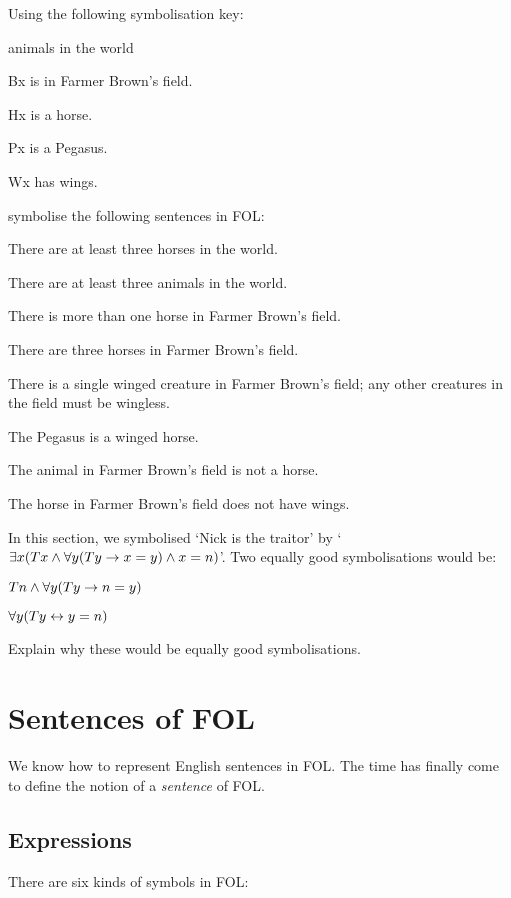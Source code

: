 \problempart Using the following symbolisation key:
\begin{ekey}
\item[\text{domain}] animals in the world
\item[Bx]  is in Farmer Brown's field.
\item[Hx]  is a horse.
\item[Px]  is a Pegasus.
\item[Wx]  has wings.
\end{ekey}
symbolise the following sentences in FOL:
\begin{earg}
\item There are at least three horses in the world.
\item There are at least three animals in the world.
\item There is more than one horse in Farmer Brown's field.
\item There are three horses in Farmer Brown's field.
\item There is a single winged creature in Farmer Brown's field; any other creatures in the field must be wingless.
\item The Pegasus is a winged horse.
\item The animal in Farmer Brown's field is not a horse.
\item The horse in Farmer Brown's field does not have wings.
\end{earg}

\problempart
In this section, we symbolised `Nick is the traitor' by `$\exists x (Tx \wedge \forall y(Ty \rightarrow x = y) \wedge x = n)$'. Two equally good symbolisations would be:
	\begin{ebullet}
		\item $Tn \wedge \forall y(Ty \rightarrow n = y)$
		\item $\forall y(Ty \leftrightarrow y = n)$
	\end{ebullet}
Explain why these would be equally good symbolisations.


\chapter{Sentences of FOL}\label{s:FOLSentences}
We know how to represent English sentences in FOL. The time has finally come to define the notion of a \emph{sentence} of FOL.

\section{Expressions}
There are six kinds of symbols in FOL:

